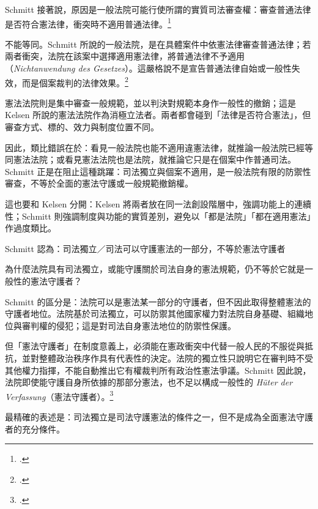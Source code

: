 Schmitt 接著說，原因是一般法院可能行使所謂的實質司法審查權：審查普通法律是否符合憲法律，衝突時不適用普通法律。\footcites[12]{schmitt1931}[82]{schmitt2015}

不能等同。Schmitt 所說的一般法院，是在具體案件中依憲法律審查普通法律；若兩者衝突，法院在該案中選擇適用憲法律，將普通法律不予適用（\emph{Nichtanwendung des Gesetzes}）。這嚴格說不是宣告普通法律自始或一般性失效，而是個案裁判的法律效果。\footcites[82--83, 88--89]{schmitt2015}[15--16, 20]{schmitt1931}

憲法法院則是集中審查一般規範，並以判決對規範本身作一般性的撤銷；這是 Kelsen 所說的憲法法院作為消極立法者。兩者都會碰到「法律是否符合憲法」，但審查方式、標的、效力與制度位置不同。

因此，類比錯誤在於：看見一般法院也能不適用違憲法律，就推論一般法院已經等同憲法法院；或看見憲法法院也是法院，就推論它只是在個案中作普通司法。Schmitt 正是在阻止這種跳躍：司法獨立與個案不適用，是一般法院有限的防禦性審查，不等於全面的憲法守護或一般規範撤銷權。

這也要和 Kelsen 分開：Kelsen 將兩者放在同一法創設階層中，強調功能上的連續性；Schmitt 則強調制度與功能的實質差別，避免以「都是法院」「都在適用憲法」作過度類比。


\begin{qaprompt}
Schmitt 認為：司法獨立／司法可以守護憲法的一部分，不等於憲法守護者
\end{qaprompt}

\begin{qaquestion}
為什麼法院具有司法獨立，或能守護關於司法自身的憲法規範，仍不等於它就是一般性的憲法守護者？
\end{qaquestion}

Schmitt 的區分是：法院可以是憲法某一部分的守護者，但不因此取得整體憲法的守護者地位。法院基於司法獨立，可以防禦其他國家權力對法院自身基礎、組織地位與審判權的侵犯；這是對司法自身憲法地位的防禦性保護。

但「憲法守護者」在制度意義上，必須能在憲政衝突中代替一般人民的不服從與抵抗，並對整體政治秩序作具有代表性的決定。法院的獨立性只說明它在審判時不受其他權力指揮，不能自動推出它有權裁判所有政治性憲法爭議。Schmitt 因此說，法院即使能守護自身所依據的那部分憲法，也不足以構成一般性的 \emph{Hüter der Verfassung}（憲法守護者）。\footcites[85, 89--90]{schmitt2015}[17, 21--22]{schmitt1931}

最精確的表述是：司法獨立是司法守護憲法的條件之一，但不是成為全面憲法守護者的充分條件。


